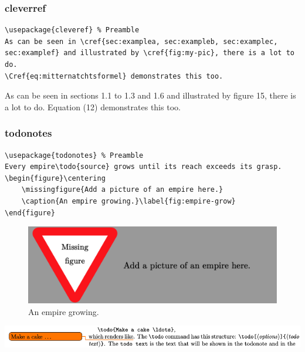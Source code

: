 \documentclass[aspectratio=169, 10pt]{beamer}
\begin{document}
\begin{frame}[fragile]
    \frametitle{cleverref}
    \begin{lstlisting}
\usepackage{cleveref} % Preamble
As can be seen in \cref{sec:examplea, sec:exampleb, sec:examplec, sec:examplef} and illustrated by \cref{fig:my-pic}, there is a lot to do.
\Cref{eq:mitternatchtsformel} demonstrates this too.
    \end{lstlisting}

    As can be seen in sections 1.1 to 1.3 and 1.6 and illustrated by figure 15, there is a lot to do.
    Equation (12) demonstrates this too.
\end{frame}

\begin{frame}[fragile]
    \frametitle{todonotes}
    \begin{lstlisting}[basicstyle=\ttfamily\footnotesize]
\usepackage{todonotes} % Preamble
Every empire\todo{source} grows until its reach exceeds its grasp.
\begin{figure}\centering
    \missingfigure{Add a picture of an empire here.}
    \caption{An empire growing.}\label{fig:empire-grow}
\end{figure}
    \end{lstlisting}

    \begin{figure}
        \centering\small
        \includegraphics[width=0.75\linewidth]{images/missfig.png}
        \caption{An empire growing.}
        \label{fig:empire-grow}
    \end{figure}

    \includegraphics[width=\linewidth]{images/todo}
\end{frame}
\end{document}
